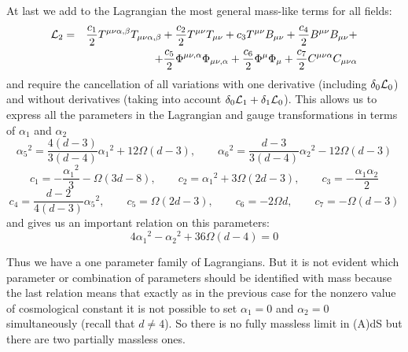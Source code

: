 \documentclass[a4paper,12pt]{article}
\begin{document}
At last we add to the Lagrangian the most general mass-like
terms for all fields:
\begin{eqnarray}
{\cal L}_2 &=& \frac{c_1}{2} T^{\mu\nu\alpha,\beta} T_{\mu\nu\alpha,\beta}
+ \frac{c_2}{2} T^{\mu\nu} T_{\mu\nu} + c_3 T^{\mu\nu} B_{\mu\nu}
+ \frac{c_4}{2} B^{\mu\nu} B_{\mu\nu} + \nonumber \\
 && + \frac{c_5}{2} \Phi^{\mu\nu,\alpha} \Phi_{\mu\nu,\alpha}
 + \frac{c_6}{2} \Phi^\mu \Phi_\mu + \frac{c_7}{2} C^{\mu\nu\alpha}
 C_{\mu\nu\alpha}
\end{eqnarray}
and require the cancellation of all variations with one derivative
(including $\delta_0 {\cal L}_0$) and without derivatives (taking
into account $\delta_0 {\cal L}_1 + \delta_1 {\cal L}_0$). This allows
us to express all the parameters in the Lagrangian and gauge
transformations in terms of $\alpha_1$ and $\alpha_2$
$$
\alpha_5{}^2 = \frac{4(d-3)}{3(d-4)} \alpha_1{}^2 + 12 \Omega (d-3), \qquad
\alpha_6{}^2 = \frac{d-3}{3(d-4)} \alpha_2{}^2 - 12 \Omega (d-3)
$$
$$
c_1 = - \frac{\alpha_1{}^2}{3} - \Omega (3d-8), \qquad c_2 = \alpha_1{}^2
+ 3 \Omega (2d-3), \qquad c_3 = - \frac{\alpha_1 \alpha_2}{2}
$$
$$
c_4 = \frac{d-2}{4(d-3)} \alpha_5{}^2, \qquad c_5 = \Omega (2d-3), \qquad
c_6 = - 2 \Omega d, \qquad c_7 = - \Omega (d-3)
$$
and gives us an important relation on this parameters:
\begin{equation}
4 \alpha_1{}^2 - \alpha_2{}^2 + 36 \Omega (d-4) = 0
\end{equation}

Thus we have a one parameter family of Lagrangians. But it is not
evident which parameter or combination of parameters should be
identified with mass because the last relation means that
exactly as in the previous case for the nonzero value of
cosmological constant it is not possible to set $\alpha_1 = 0$
and $\alpha_2 = 0$ simultaneously (recall that $d \ne 4$).
So there is no fully massless limit in (A)dS but there are two
partially massless ones.
\end{document}
